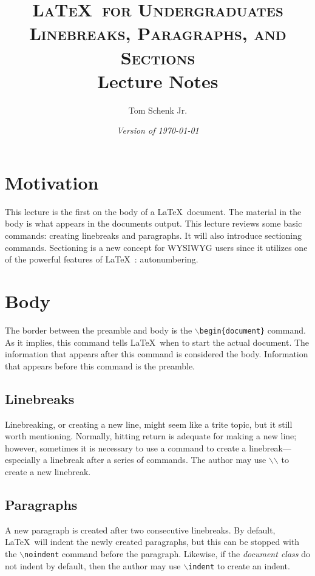 \documentclass{article}
\title{\textsc{\LaTeX\ for Undergraduates\\
			Linebreaks, Paragraphs, and Sections} \\
			Lecture Notes}
\author{Tom Schenk Jr.}
\date{\textit{Version of \today}}
\begin{document}
\maketitle

\section{Motivation}

This lecture is the first on the body of a \LaTeX\ document. The material in the body is what appears in the documents output. This lecture reviews some basic commands: creating linebreaks and paragraphs. It will also introduce sectioning commands. Sectioning is a new concept for WYSIWYG users since it utilizes one of the powerful features of \LaTeX\ : autonumbering.

\section{Body}

The border between the preamble and body is the \texttt{$\backslash$begin\{document\}} command. As it implies, this command tells \LaTeX\ when to start the actual document. The information that appears after this command is considered the body. Information that appears before this command is the preamble.

\subsection{Linebreaks}

Linebreaking, or creating a new line, might seem like a trite topic, but it still worth mentioning. Normally, hitting return is adequate for making a new line; however, sometimes it is necessary to use a command to create a linebreak---especially a linebreak after a series of commands. The author may use \texttt{$\backslash$$\backslash$} to create a new linebreak.

\subsection{Paragraphs}

A new paragraph is created after two consecutive linebreaks. By default, \LaTeX\ will indent the newly created paragraphs, but this can be stopped with the \texttt{$\backslash$noindent} command before the paragraph. Likewise, if the \textit{document class} do not indent by default, then the author may use \texttt{$\backslash$indent} to create an indent.
\end{document}
